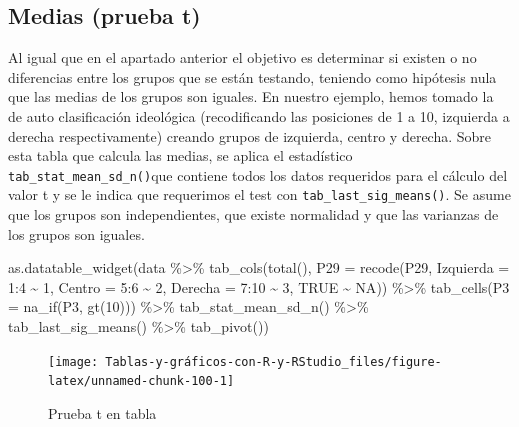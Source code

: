 \documentclass[
]{book}
\newenvironment{Shaded}{\begin{snugshade}}{\end{snugshade}}
\newcommand{\AttributeTok}[1]{\textcolor[rgb]{0.77,0.63,0.00}{#1}}
\newcommand{\ConstantTok}[1]{\textcolor[rgb]{0.00,0.00,0.00}{#1}}
\newcommand{\DecValTok}[1]{\textcolor[rgb]{0.00,0.00,0.81}{#1}}
\newcommand{\FunctionTok}[1]{\textcolor[rgb]{0.00,0.00,0.00}{#1}}
\newcommand{\NormalTok}[1]{#1}
\newcommand{\SpecialCharTok}[1]{\textcolor[rgb]{0.00,0.00,0.00}{#1}}
\begin{document}
\hypertarget{medias-prueba-t}{%
\subsection{Medias (prueba t)}\label{medias-prueba-t}}

Al igual que en el apartado anterior el objetivo es determinar si existen o no diferencias entre los grupos que se están testando, teniendo como hipótesis nula que las medias de los grupos son iguales. En nuestro ejemplo, hemos tomado la de auto clasificación ideológica (recodificando las posiciones de 1 a 10, izquierda a derecha respectivamente) creando grupos de izquierda, centro y derecha. Sobre esta tabla que calcula las medias, se aplica el estadístico \texttt{tab\_stat\_mean\_sd\_n()}que contiene todos los datos requeridos para el cálculo del valor t y se le indica que requerimos el test con \texttt{tab\_last\_sig\_means()}. Se asume que los grupos son independientes, que existe normalidad y que las varianzas de los grupos son iguales.

\begin{Shaded}
\begin{Highlighting}[]
\FunctionTok{as.datatable\_widget}\NormalTok{(data }\SpecialCharTok{\%\textgreater{}\%} \FunctionTok{tab\_cols}\NormalTok{(}\FunctionTok{total}\NormalTok{(), }\AttributeTok{P29 =} \FunctionTok{recode}\NormalTok{(P29, }
  \AttributeTok{Izquierda =} \DecValTok{1}\SpecialCharTok{:}\DecValTok{4} \SpecialCharTok{\textasciitilde{}} \DecValTok{1}\NormalTok{, }\AttributeTok{Centro =} \DecValTok{5}\SpecialCharTok{:}\DecValTok{6} \SpecialCharTok{\textasciitilde{}} \DecValTok{2}\NormalTok{, }\AttributeTok{Derecha =} \DecValTok{7}\SpecialCharTok{:}\DecValTok{10} \SpecialCharTok{\textasciitilde{}} 
    \DecValTok{3}\NormalTok{, }\ConstantTok{TRUE} \SpecialCharTok{\textasciitilde{}} \ConstantTok{NA}\NormalTok{)) }\SpecialCharTok{\%\textgreater{}\%} \FunctionTok{tab\_cells}\NormalTok{(}\AttributeTok{P3 =} \FunctionTok{na\_if}\NormalTok{(P3, }\FunctionTok{gt}\NormalTok{(}\DecValTok{10}\NormalTok{))) }\SpecialCharTok{\%\textgreater{}\%} 
  \FunctionTok{tab\_stat\_mean\_sd\_n}\NormalTok{() }\SpecialCharTok{\%\textgreater{}\%} \FunctionTok{tab\_last\_sig\_means}\NormalTok{() }\SpecialCharTok{\%\textgreater{}\%} \FunctionTok{tab\_pivot}\NormalTok{())}
\end{Highlighting}
\end{Shaded}

\begin{figure}[H]

{\centering \texttt{[image: Tablas-y-gráficos-con-R-y-RStudio\_files/figure-latex/unnamed-chunk-100-1]} 

}

\caption{Prueba t en tabla}\label{fig:unnamed-chunk-100}
\end{figure}
\end{document}

